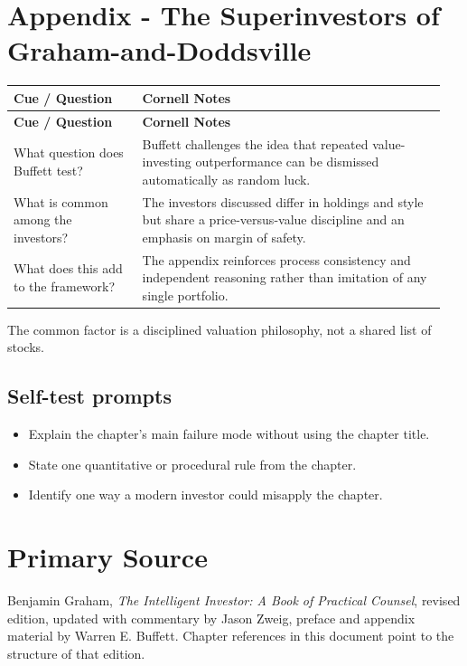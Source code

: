 \documentclass[11pt]{article}
\begin{document}
\section{Appendix - The Superinvestors of Graham-and-Doddsville}
\begin{longtable}{@{}>{\raggedright\arraybackslash}p{0.29\linewidth}>{\raggedright\arraybackslash}p{0.66\linewidth}@{}}\toprule\textbf{Cue / Question} & \textbf{Cornell Notes}\\\midrule\endfirsthead\toprule\textbf{Cue / Question} & \textbf{Cornell Notes}\\\midrule\endhead
What question does Buffett test? & Buffett challenges the idea that repeated value-investing outperformance can be dismissed automatically as random luck. \\
What is common among the investors? & The investors discussed differ in holdings and style but share a price-versus-value discipline and an emphasis on margin of safety. \\
What does this add to the framework? & The appendix reinforces process consistency and independent reasoning rather than imitation of any single portfolio. \\
\bottomrule\end{longtable}
\begin{principlebox}The common factor is a disciplined valuation philosophy, not a shared list of stocks.\end{principlebox}
\subsection*{Self-test prompts}\begin{itemize}\item Explain the chapter's main failure mode without using the chapter title.\item State one quantitative or procedural rule from the chapter.\item Identify one way a modern investor could misapply the chapter.\end{itemize}

\section*{Primary Source}
Benjamin Graham, \textit{The Intelligent Investor: A Book of Practical Counsel}, revised edition, updated with commentary by Jason Zweig, preface and appendix material by Warren E. Buffett. Chapter references in this document point to the structure of that edition.
\end{document}

